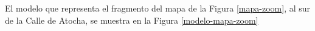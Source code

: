 El modelo que representa el fragmento del mapa de la Figura \ref{mapa-zoom}, al sur de la Calle de Atocha, se muestra en la Figura \ref{modelo-mapa-zoom}


